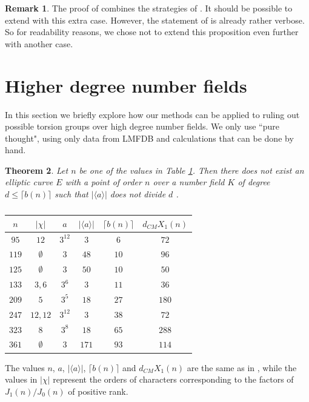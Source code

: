 \documentclass[11pt,reqno]{amsart}
\newtheorem{theorem}{Theorem}[section]
\theoremstyle{definition}
\newtheorem{remark}[theorem]{Remark}
\numberwithin{equation}{section}
\newcommand{\diamondop}[1]{\langle #1 \rangle} %
\begin{document}
\begin{remark}
    The proof of  combines the strategies of . It should be possible to extend  with this extra case. However, the statement of  is already rather verbose. So for readability reasons, we chose not to extend this proposition even further with another case.
\end{remark}

\section{Higher degree number fields} \label{sec:higher_deg}

In this section we briefly explore how our methods can be applied to ruling out possible torsion groups over high degree number fields. We only use ``pure thought", using only data from LMFDB and calculations that can be done by hand. 

\begin{theorem}\label{thm:d5r1}
Let $n$ be one of the values in Table \ref{table:higher_degree}. Then there does not exist an elliptic curve $E$ with a point of order $n$ over a number field $K$ of degree $d\leq \lceil b(n) \rceil$ such that $|\diamondop{a}|$ does not divide $ d$ .
\begin{table}[H]
\centering
\begin{tabular}{c|c|c|c|c|c}
$n$ & $|\chi|$& $a$ & $|\diamondop{a}|$ & $\lceil b(n)\rceil $ &  $d_{CM}X_1(n) $ \\ 
\hline
$95$ &$12$ & $3^{12}$  & $3$  & $6$  & $72$  \\
$119$ &$\emptyset$ & $3$  & $48$  & $10$  & $96$  \\
$125$ &$\emptyset$ & $3$  & $50$  & $10$  & $50$  \\
$133$ &$3,6$ & $3^6$  & $3$  & $11$  & $36$  \\
 $209$ &$5$ & $3^5$  & $18$  & $27$  & $180$  \\
 $247$ &$12,12$ & $3^{12}$  & $3$  & $38$  & $72$  \\
 $323$ &$8$ & $3^8$  & $18$  & $65$  & $288$  \\
 $361$ &$\emptyset$ & $3$  & $171$  & $93$  & $114$  \\
\end{tabular}
\caption{}\label{table:higher_degree}
\end{table}
\end{theorem}
The values $n$, $a$, $|\diamondop{a}|$, $\lceil b(n)\rceil $ and $d_{CM}X_1(n)$ are the same as in , while the values in $|\chi|$ represent the orders of characters corresponding to the factors of $J_1(n)/J_0(n)$ of positive rank. 
\end{document}
